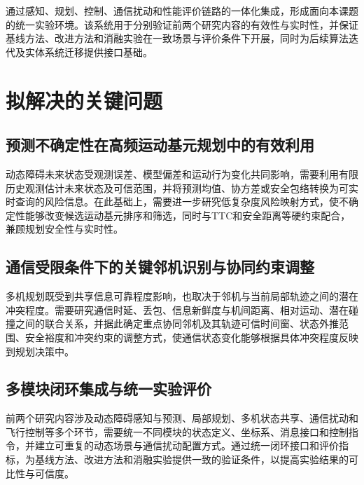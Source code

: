 通过感知、规划、控制、通信扰动和性能评价链路的一体化集成，形成面向本课题的统一实验环境。该系统用于分别验证前两个研究内容的有效性与实时性，并保证基线方法、改进方法和消融实验在一致场景与评价条件下开展，同时为后续算法迭代及实体系统迁移提供接口基础。

\section{拟解决的关键问题}

\subsection{预测不确定性在高频运动基元规划中的有效利用}

动态障碍未来状态受观测误差、模型偏差和运动行为变化共同影响，需要利用有限历史观测估计未来状态及可信范围，并将预测均值、协方差或安全包络转换为可实时查询的风险信息。在此基础上，需要进一步研究低复杂度风险映射方式，使不确定性能够改变候选运动基元排序和筛选，同时与TTC和安全距离等硬约束配合，兼顾规划安全性与实时性。

\subsection{通信受限条件下的关键邻机识别与协同约束调整}

多机规划既受到共享信息可靠程度影响，也取决于邻机与当前局部轨迹之间的潜在冲突程度。需要研究通信时延、丢包、信息新鲜度与机间距离、相对运动、潜在碰撞之间的联合关系，并据此确定重点协同邻机及其轨迹可信时间窗、状态外推范围、安全裕度和冲突约束的调整方式，使通信状态变化能够根据具体冲突程度反映到规划决策中。

\subsection{多模块闭环集成与统一实验评价}

前两个研究内容涉及动态障碍感知与预测、局部规划、多机状态共享、通信扰动和飞行控制等多个环节，需要统一不同模块的状态定义、坐标系、消息接口和控制指令，并建立可重复的动态场景与通信扰动配置方式。通过统一闭环接口和评价指标，为基线方法、改进方法和消融实验提供一致的验证条件，以提高实验结果的可比性与可信度。
